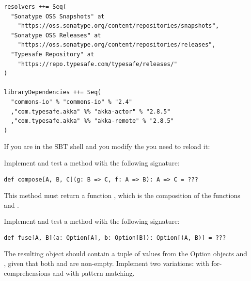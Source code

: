 \documentclass[11pt]{article}
\begin{document}
\begin{myExercise}
\begin{lstlisting}
resolvers ++= Seq(
  "Sonatype OSS Snapshots" at
    "https://oss.sonatype.org/content/repositories/snapshots",
  "Sonatype OSS Releases" at
    "https://oss.sonatype.org/content/repositories/releases",
  "Typesafe Repository" at
    "https://repo.typesafe.com/typesafe/releases/"
)

libraryDependencies ++= Seq(
  "commons-io" % "commons-io" % "2.4"
  ,"com.typesafe.akka" %% "akka-actor" % "2.8.5"
  ,"com.typesafe.akka" %% "akka-remote" % "2.8.5"
)
\end{lstlisting}
If you are in the SBT shell and you modify the  you need to reload it:
\\

\end{myExercise}

\begin{myExercise}
Implement and test a  method with the following signature:
\begin{lstlisting}
def compose[A, B, C](g: B => C, f: A => B): A => C = ???
\end{lstlisting}
This method must return a function , which is the composition of the
functions  and .
\end{myExercise}

\begin{myExercise}
Implement and test a  method with the following signature:
\begin{lstlisting}
def fuse[A, B](a: Option[A], b: Option[B]): Option[(A, B)] = ???
\end{lstlisting}
The resulting  object should contain a tuple of values from the Option objects  and , given that both  and  are non-empty. Implement two variations: with for-comprehensions and with pattern matching.
\end{myExercise}
\end{document}
